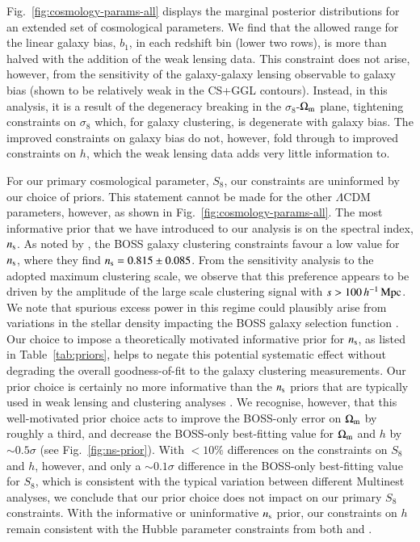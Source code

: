 Fig.~\ref{fig:cosmology-params-all} displays the marginal posterior distributions for an extended set of cosmological parameters.  
We find that the allowed range for the linear galaxy bias,  $b_1$, in each redshift bin (lower two rows), is more than halved with the addition of the weak lensing data. 
This constraint does not arise, however, from the sensitivity of the galaxy-galaxy lensing observable to galaxy bias (shown to be relatively weak in the CS+GGL contours). 
Instead, in this analysis, it is a result of the degeneracy breaking in the $\sigma_8$-$\Omega_{\rm m}$ plane, tightening constraints on $\sigma_8$ which, for galaxy clustering, is degenerate with galaxy bias. 
The improved constraints on galaxy bias do not, however, fold through to improved constraints on $h$, which the weak lensing data adds very little information to. 

For our primary cosmological parameter, $S_8$, our constraints are uninformed by our choice of priors.    This statement cannot be made for the other $\Lambda$CDM parameters, however, as shown in Fig.~\ref{fig:cosmology-params-all}.   The most informative prior that we have introduced to our \tttp analysis is on the spectral index, $n_{\rm s}$.  As noted by \citet{troester/etal:2020}, the BOSS galaxy clustering constraints favour a low value for $n_{\rm s}$, where they find $n_{\rm s} = 0.815 \pm 0.085$. 
From the \citet{troester/etal:2020} sensitivity analysis to the adopted maximum clustering scale, we observe that this preference appears to be driven by the amplitude of the large scale clustering signal with $s > 100 \, h^{-1}\, {\rm Mpc}$.  We note that spurious excess power in this regime could plausibly arise from variations in the stellar density impacting the BOSS galaxy selection function \citep{ross/etal:2017}.  Our choice to impose a theoretically motivated informative prior for $n_{\rm s}$, as listed in Table~\ref{tab:priors}, helps to negate this potential systematic effect without degrading the overall goodness-of-fit to the galaxy clustering measurements.  Our prior choice is certainly no more informative than the $n_{\rm s}$ priors that are typically used in weak lensing and clustering analyses \citep[see for example][]{abbott/etal:2018,eBOSS/etal:2020}. 
We recognise, however, that this well-motivated prior choice acts to improve the BOSS-only error on $\Omega_{\rm m}$ by roughly a third, and decrease the BOSS-only best-fitting value for $\Omega_{\rm m}$ and $h$ by $\sim 0.5\sigma$ (see Fig.~\ref{fig:ns-prior}).  With $<10\%$ differences on the constraints on $S_8$ and $h$, however, and only a $\sim 0.1\sigma$ difference in the BOSS-only best-fitting value for $S_8$, which is consistent with the typical variation between different {\sc Multinest} analyses, we conclude that our prior choice does not impact on our primary $S_8$ constraints.   With the informative or uninformative $n_{\rm s}$ prior, our constraints on $h$ remain consistent with the Hubble parameter constraints from both \citet{planck/etal:2018} and \citet{riess/etal:2019}.

